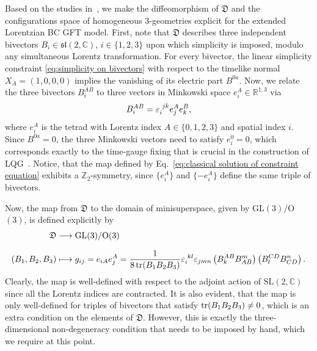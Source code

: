 \documentclass[11pt,a4paper]{article}
\newcommand{\R}{\mathbb R}
\newcommand{\C}{\mathbb C}
\newcommand{\SL}{\text{SL$(2,\C)$}}
\newcommand{\spl}{\mathfrak{sl}\left(2,\C\right)}
\begin{document}
Based on the studies in~\cite{Gielen:2013naa, Gielen:2014ila}, we make the diffeomorphism of $\mathfrak{D}$ and the configurations space of homogeneous 3-geometries explicit for the extended Lorentzian BC GFT model. First, note that $\mathfrak{D}$ describes three independent bivectors $B_i\in\spl$, $i\in\{1,2,3\}$ upon which simplicity is imposed, modulo any simultaneous Lorentz transformation. For every bivector, the linear simplicity constraint \eqref{eq:simplicity on bivectors} with respect to the timelike normal $X_A = (1,0,0,0)$ implies the vanishing of its electric part $B^{0a}$. Now, we relate the three bivectors $B_i^{AB}$ to three vectors in Minkowski space $e_i^A\in\R^{1,3}$ via~\cite{Freidel:1999rr}
%
\begin{equation}\label{eq:classical solution of constraint equation}
B_i^{AB} = \tensor{\varepsilon}{_i^{jk}}e_j^A e_k^B,
\end{equation}
%
where $e_i^A$ is the tetrad with Lorentz index $A\in\{0,1,2,3\}$ and spatial index $i$. Since $B^{0a} = 0$, the three Minkowski vectors need to satisfy $e_i^0 = 0$, which corresponds exactly to the time-gauge fixing that is crucial in the construction of LQG~\cite{Rovelli:2014ssa}. Notice, that the map defined by Eq.~\eqref{eq:classical solution of constraint equation} exhibits a $\mathbb{Z}_2$-symmetry, since $\{e_i^A\}$ and $\{-e_i^A\}$ define the same triple of bivectors. 

Now, the map from $\mathfrak{D}$ to the domain of minisuperspace, given by GL$(3)/$O$(3)$, is defined explicitly by~\cite{Gielen:2013naa}
%
\begin{equation}\label{eq:map to metric coefficients}
\begin{aligned}
\mathfrak{D} & \longrightarrow \text{GL}(3)/\text{O}(3)\\[7pt]
(B_1, B_2, B_3) & \longmapsto g_{ij} = e_{iA}e_j^A = \frac{1}{8\tr(B_1 B_2 B_3)}\tensor{\varepsilon}{_i^{kl}}\varepsilon_{jmn}\left(B_k^{AB}B^m_{AB}\right)\left(B_l^{CD}B^n_{CD}\right).
\end{aligned}
\end{equation}
%
Clearly, the map is well-defined with respect to the adjoint action of $\SL$ since all the Lorentz indices are contracted. It is also evident, that the map is only well-defined for triples of bivectors that satisfy $\tr(B_1 B_2 B_3)\neq 0$, which is an extra condition on the elements of $\mathfrak{D}$. However, this is exactly the three-dimensional non-degeneracy condition that needs to be imposed by hand, which we require at this point. 
\end{document}

